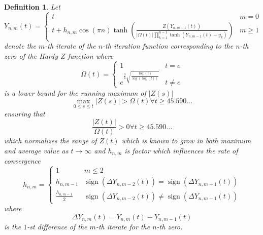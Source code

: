 \documentclass{article}
\newcommand{\tmop}[1]{\ensuremath{\operatorname{#1}}}
\newtheorem{definition}{Definition}
\begin{document}
\begin{definition}
  Let
  \[ Y_{n, m} (t) = \left\{ \begin{array}{ll}
       t & m = 0\\
       t + h_{n, m} \cos (\pi n) \tanh \left( \frac{Z (Y_{n, m - 1} (t))}{|
       \Omega (t) | \prod_{k = 1}^{n - 1} \tanh (Y_{n, m - 1} (t) - y_k)}
       \right) & m \geqslant 1
     \end{array} \right. \]
  denote the $m$-th iterate of the $n$-th iteration function corresponding to
  the $n$-th zero of the Hardy $Z$ function where
  \begin{equation}
    \Omega (t) = \left\{ \begin{array}{ll}
      1 & t = e\\
      e^{\frac{3}{4} \sqrt{\frac{\log (t)}{\log (\log (t))}}} & t \neq e
    \end{array} \right.
  \end{equation}
  is a lower bound for the running maximum of $| Z (s) |$
  \begin{equation}
    \max_{0 \leqslant s \leqslant t} | Z (s) | > \Omega (t) \forall t
    \geqslant 45.590 \ldots
  \end{equation}
  ensuring that
  \begin{equation}
    \frac{| Z (t) |}{\Omega (t)} > 0 \forall t \geqslant 45.590 \ldots
  \end{equation}
  which normalizes the range of $Z (t)$ which is known to grow in both maximum
  and average value as $t \rightarrow \infty$ and $h_{n, m}$ is factor which
  influences the rate of convergence
  \begin{equation}
    h_{n, m} = \left\{ \begin{array}{ll}
      1 & m \leqslant 2\\
      h_{n, m - 1} & \tmop{sign} (\Delta Y^{}_{n, m - 2} (t)) = \tmop{sign}
      (\Delta Y^{}_{n, m - 1} (t))\\
      \frac{h_{n, m - 1}}{2} & \tmop{sign} (\Delta Y^{}_{n, m - 2} (t)) \neq
      \tmop{sign} (\Delta Y^{}_{n, m - 1} (t))
    \end{array} \right.
  \end{equation}
  where
  \begin{equation}
    \Delta Y_{n, m} (t) = Y_{n, m} (t) - Y_{n, m - 1} (t)
  \end{equation}
  is the $1$-st difference of the $m$-th iterate for the $n$-th zero.
  {\cite[Theorem 3.2.3]{ramachandra1995lectures}} 
\end{definition}
\end{document}
